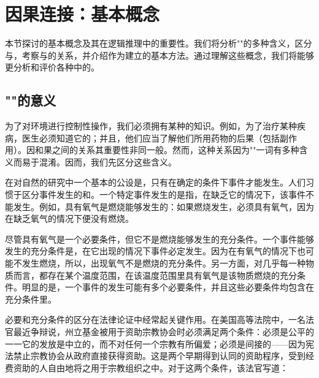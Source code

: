 \section{因果连接：基本概念}

\begin{logicbox}[title=引言]
本节探讨的基本概念及其在逻辑推理中的重要性。我们将分析""的多种含义，区分与，考察与的关系，并介绍作为建立的基本方法。通过理解这些概念，我们将能够更分析和评价各种中的。
\end{logicbox}

\subsection{""的意义}

为了对环境进行控制性操作，我们必须拥有某种的知识。例如，为了治疗某种疾病，医生必须知道它的；并且，他们应当了解他们所用药物的后果（包括副作用）。因和果之间的关系其重要性非同一般。然而，这种关系因为""一词有多种含义而易于混淆。因而，我们先区分这些含义。

\begin{theorembox}[title=必要条件与充分条件]
在对自然的研究中一个基本的公设是，只有在确定的条件下事件才能发生。人们习惯于区分事件发生的和。一个特定事件发生的是指，在缺乏它的情况下，该事件不能发生。例如，具有氧气是燃烧能够发生的：如果燃烧发生，必须具有氧气，因为在缺乏氧气的情况下便没有燃烧。
\end{theorembox}

尽管具有氧气是一个必要条件，但它不是燃烧能够发生的充分条件。一个事件能够发生的充分条件是，在它出现的情况下事件必定发生。因为在有氧气的情况下也可能不发生燃烧，所以，出现氧气不是燃烧的充分条件。另一方面，对几乎每一种物质而言，都存在某个温度范围，在该温度范围里具有氧气是该物质燃烧的充分条件。明显的是，一个事件的发生可能有多个必要条件，并且这些必要条件均包含在充分条件里。

必要和充分条件的区分在法律论证中经常起关键作用。在美国高等法院中，一名法官最近争辩说，州立基金被用于资助宗教协会时必须满足两个条件：必须是公平的一一它的发放是中立的，而不对任何一个宗教有所偏爱；必须是间接的——因为宪法禁止宗教协会从政府直接获得资助。这是两个早期得到认同的资助程序，受到经费资助的人自由地将之用于宗教组织之中。对于这两个条件，该法官写道：


